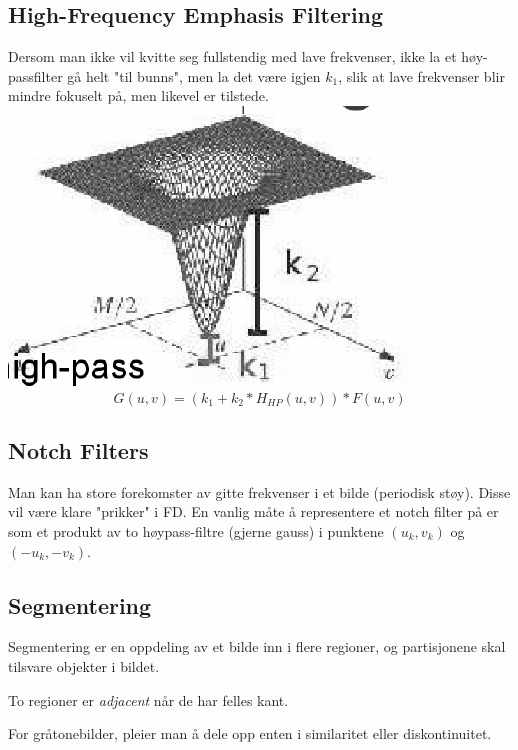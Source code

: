 \subsection{High-Frequency Emphasis Filtering}
Dersom man ikke vil kvitte seg fullstendig med lave frekvenser, ikke la et høy-passfilter gå helt "til bunns", men la det være igjen $k_1$, slik at lave frekvenser blir mindre fokuselt på, men likevel er tilstede.
\\ \includegraphics[width=\textwidth]{Bilder/hfef.png}
\begin{equation}
    G(u,v) = (k_1 + k_2*H_{HP}(u,v))*F(u,v)
\end{equation}

\subsection{Notch Filters}
Man kan ha store forekomster av gitte frekvenser i et bilde (periodisk støy). Disse vil være klare "prikker" i FD. En vanlig måte å representere et notch filter på er som et produkt av to høypass-filtre (gjerne gauss) i punktene $(u_k, v_k)$ og $(-u_k, -v_k)$.

\subsection{Segmentering}
Segmentering er en oppdeling av et bilde inn i flere regioner, og partisjonene skal tilsvare objekter i bildet.

To regioner er \emph{adjacent} når de har felles kant.

For gråtonebilder, pleier man å dele opp enten i similaritet eller diskontinuitet.

